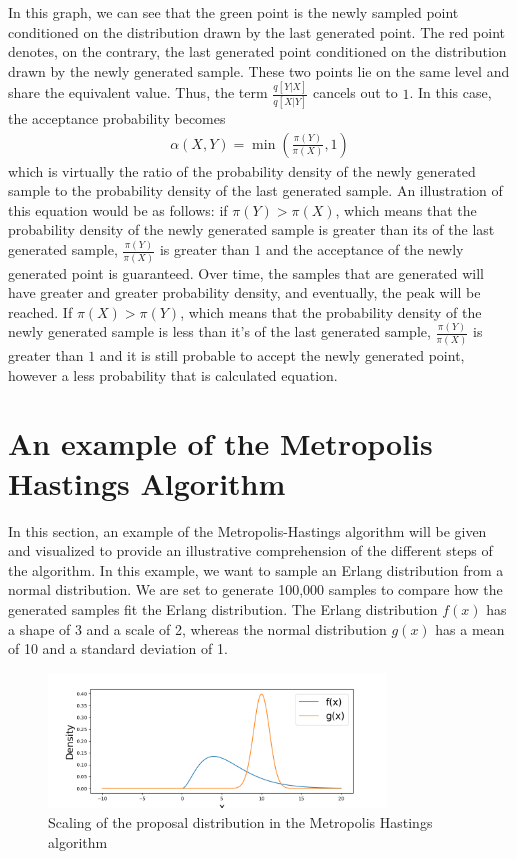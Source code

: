 In this graph, we can see that the green point is the newly sampled point conditioned on the distribution drawn by the last generated point. The red point denotes, on the contrary, the last generated point conditioned on the distribution drawn by the newly generated sample. These two points lie on the same level and share the equivalent value. Thus, the term $\frac{q[Y|X]}{q[X|Y]}$ cancels out to $1$. In this case, the acceptance probability becomes
\begin{align}
\alpha(X, Y) = \min (\frac{\pi(Y)}{\pi(X)}, 1)
\end{align}
which is virtually the ratio of the probability density of the newly generated sample to the probability density of the last generated sample. An illustration of this equation would be as follows: if $\pi(Y) > \pi(X)$, which means that the probability density of the newly generated sample is greater than its of the last generated sample, $\frac{\pi(Y)}{\pi(X)}$ is greater than $1$ and the acceptance of the newly generated point is guaranteed. Over time, the samples that are generated will have greater and greater probability density, and eventually, the peak will be reached. If $\pi(X) > \pi(Y)$, which means that the probability density of the newly generated sample is less than it's of the last generated sample, $\frac{\pi(Y)}{\pi(X)}$ is greater than $1$ and it is still probable to accept the newly generated point, however a less probability that is calculated equation.\cite{understanding_mh}

\section{An example of the Metropolis Hastings Algorithm}
In this section, an example of the Metropolis-Hastings algorithm will be given and visualized to provide an illustrative comprehension of the different steps of the algorithm. In this example, we want to sample an Erlang distribution from a normal distribution. We are set to generate 100,000 samples to compare how the generated samples fit the Erlang distribution. The Erlang distribution $f(x)$ has a shape of 3 and a scale of 2, whereas the normal distribution $g(x)$ has a mean of 10 and a standard deviation of 1.

\begin{figure}[H]
    \centering
    \includegraphics[width=0.8\textwidth]{figures/mcmc_example/first_step.png}
    \captionsetup{width=.8\textwidth}
    \caption{Scaling of the proposal distribution in the Metropolis Hastings algorithm}
    \label{fig:enter-label}
\end{figure}


